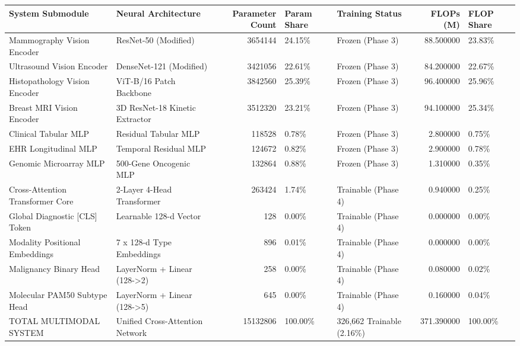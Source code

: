 \begin{tabular}{llrllrl}
\toprule
System Submodule & Neural Architecture & Parameter Count & Param Share & Training Status & FLOPs (M) & FLOP Share \\
\midrule
Mammography Vision Encoder & ResNet-50 (Modified) & 3654144 & 24.15\% & Frozen (Phase 3) & 88.500000 & 23.83\% \\
Ultrasound Vision Encoder & DenseNet-121 (Modified) & 3421056 & 22.61\% & Frozen (Phase 3) & 84.200000 & 22.67\% \\
Histopathology Vision Encoder & ViT-B/16 Patch Backbone & 3842560 & 25.39\% & Frozen (Phase 3) & 96.400000 & 25.96\% \\
Breast MRI Vision Encoder & 3D ResNet-18 Kinetic Extractor & 3512320 & 23.21\% & Frozen (Phase 3) & 94.100000 & 25.34\% \\
Clinical Tabular MLP & Residual Tabular MLP & 118528 & 0.78\% & Frozen (Phase 3) & 2.800000 & 0.75\% \\
EHR Longitudinal MLP & Temporal Residual MLP & 124672 & 0.82\% & Frozen (Phase 3) & 2.900000 & 0.78\% \\
Genomic Microarray MLP & 500-Gene Oncogenic MLP & 132864 & 0.88\% & Frozen (Phase 3) & 1.310000 & 0.35\% \\
Cross-Attention Transformer Core & 2-Layer 4-Head Transformer & 263424 & 1.74\% & Trainable (Phase 4) & 0.940000 & 0.25\% \\
Global Diagnostic [CLS] Token & Learnable 128-d Vector & 128 & 0.00\% & Trainable (Phase 4) & 0.000000 & 0.00\% \\
Modality Positional Embeddings & 7 x 128-d Type Embeddings & 896 & 0.01\% & Trainable (Phase 4) & 0.000000 & 0.00\% \\
Malignancy Binary Head & LayerNorm + Linear (128->2) & 258 & 0.00\% & Trainable (Phase 4) & 0.080000 & 0.02\% \\
Molecular PAM50 Subtype Head & LayerNorm + Linear (128->5) & 645 & 0.00\% & Trainable (Phase 4) & 0.160000 & 0.04\% \\
TOTAL MULTIMODAL SYSTEM & Unified Cross-Attention Network & 15132806 & 100.00\% & 326,662 Trainable (2.16\%) & 371.390000 & 100.00\% \\
\bottomrule
\end{tabular}
